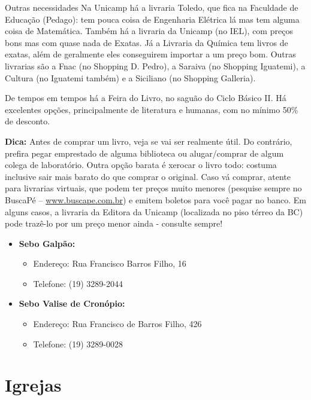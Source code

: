 \begin{story}{Outras necessidades}
Na Unicamp há a livraria Toledo, que fica na Faculdade de Educação (Pedago): tem pouca coisa de Engenharia Elétrica lá mas tem alguma coisa de Matemática. Também há a livraria da Unicamp (no IEL), com preços bons mas com quase nada de Exatas. Já a Livraria da Química tem livros de exatas, além de geralmente eles conseguirem importar a um preço bom. Outras livrarias são a Fnac (no Shopping D. Pedro), a Saraiva (no Shopping Iguatemi), a Cultura (no Iguatemi também) e a Siciliano (no Shopping Galleria).

De tempos em tempos há a Feira do Livro, no saguão do Ciclo Básico II. Há excelentes opções, principalmente de literatura e humanas, com no mínimo 50\% de desconto.

\textbf{Dica:} Antes de comprar um livro, veja se vai ser realmente útil. Do contrário, prefira pegar emprestado de alguma biblioteca ou alugar/comprar de algum colega de laboratório. Outra opção barata é xerocar o livro todo: costuma inclusive sair mais barato do que comprar o original. Caso vá comprar, atente para livrarias virtuais, que podem ter preços muito menores (pesquise sempre no BuscaPé -- \url{www.buscape.com.br}) e emitem boletos para você pagar no banco. Em alguns casos, a livraria da Editora da Unicamp (localizada no piso térreo da BC) pode trazê-lo por um preço menor ainda - consulte sempre!

\begin{itemize}
\item \textbf{Sebo Galpão:}
\begin{itemize}
\item Endereço: Rua Francisco Barros Filho, 16
\item Telefone: (19) 3289-2044
\end{itemize}

\item \textbf{Sebo Valise de Cronópio:}
\begin{itemize}
\item Endereço: Rua Francisco de Barros Filho, 426
\item Telefone: (19) 3289-0028
\end{itemize}

\end{itemize}

\section*{Igrejas}

\begin{itemize}


\end{itemize}
\end{story}
